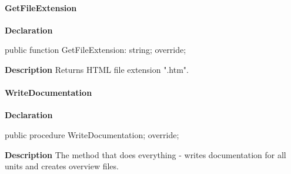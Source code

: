 \documentclass{report}
\newif\ifpdf
\begin{document}
\paragraph*{GetFileExtension}\hspace*{\fill}

\label{PasDoc_GenHtml.TGenericHTMLDocGenerator-GetFileExtension}
\begin{list}{}{
\setlength{\itemindent}{0cm}
\setlength{\listparindent}{0cm}
\setlength{\leftmargin}{\evensidemargin}
\addtolength{\leftmargin}{\tmplength}
\settowidth{\labelsep}{X}
\addtolength{\leftmargin}{\labelsep}
\setlength{\labelwidth}{\tmplength}
}
\item[\textbf{Declaration}\hfill]
\ifpdf
\begin{flushleft}
\fi
\begin{ttfamily}
public function GetFileExtension: string; override;\end{ttfamily}

\ifpdf
\end{flushleft}
\fi

\par
\item[\textbf{Description}]
Returns HTML file extension ".htm".

\end{list}
\paragraph*{WriteDocumentation}\hspace*{\fill}

\label{PasDoc_GenHtml.TGenericHTMLDocGenerator-WriteDocumentation}
\begin{list}{}{
\setlength{\itemindent}{0cm}
\setlength{\listparindent}{0cm}
\setlength{\leftmargin}{\evensidemargin}
\addtolength{\leftmargin}{\tmplength}
\settowidth{\labelsep}{X}
\addtolength{\leftmargin}{\labelsep}
\setlength{\labelwidth}{\tmplength}
}
\item[\textbf{Declaration}\hfill]
\ifpdf
\begin{flushleft}
\fi
\begin{ttfamily}
public procedure WriteDocumentation; override;\end{ttfamily}

\ifpdf
\end{flushleft}
\fi

\par
\item[\textbf{Description}]
The method that does everything {-} writes documentation for all units and creates overview files.

\end{list}
\ifpdf
\end{document}

